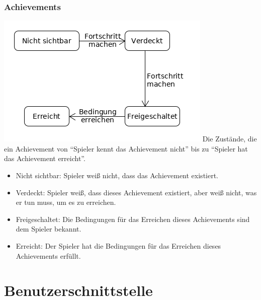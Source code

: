 \documentclass[a4paper]{scrreprt}
\begin{document}
    \subsection{Achievements}
    \label{fig:Achievment_State}
    \includegraphics[width=\textwidth]{uml/export/Achievment_State.png}
    Die Zustände, die ein \Gls{Achievement} von \enquote{\Gls{Spieler} kennt das \Gls{Achievement} nicht} bis zu \enquote{\Gls{Spieler} hat das \Gls{Achievement} erreicht}.
    \begin{itemize}
    \item Nicht sichtbar: \Gls{Spieler} weiß nicht, dass das \Gls{Achievement} existiert.
    \item Verdeckt: \Gls{Spieler} weiß, dass dieses \Gls{Achievement} existiert, aber weiß nicht, was er tun muss, um es zu erreichen.
    \item Freigeschaltet: Die Bedingungen für das Erreichen dieses \Gls{Achievement}s sind dem \Gls{Spieler} bekannt.
    \item Erreicht: Der \Gls{Spieler} hat die Bedingungen für das Erreichen dieses \Gls{Achievement}s erfüllt.
    \end{itemize}
    

    \chapter{Benutzerschnittstelle}
\end{document}
